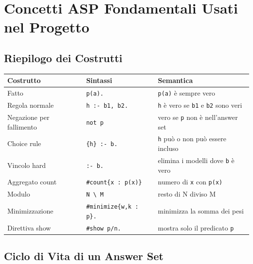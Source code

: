\documentclass[12pt,a4paper]{article}
\begin{document}
\section{Concetti ASP Fondamentali Usati nel Progetto}

\subsection{Riepilogo dei Costrutti}

\begin{center}
\renewcommand{\arraystretch}{1.4}
\begin{tabular}{p{4.5cm}p{4cm}p{5cm}}
\toprule
\textbf{Costrutto} & \textbf{Sintassi} & \textbf{Semantica} \\
\midrule
Fatto & \texttt{p(a).} & \texttt{p(a)} è sempre vero \\
Regola normale & \texttt{h :- b1, b2.} & \texttt{h} è vero se \texttt{b1} e \texttt{b2} sono veri \\
Negazione per fallimento & \texttt{not p} & vero se \texttt{p} non è nell'answer set \\
Choice rule & \texttt{\{h\} :- b.} & \texttt{h} può o non può essere incluso \\
Vincolo hard & \texttt{:- b.} & elimina i modelli dove \texttt{b} è vero \\
Aggregato count & \texttt{\#count\{x : p(x)\}} & numero di \texttt{x} con \texttt{p(x)} \\
Modulo & \texttt{N \textbackslash{} M} & resto di N diviso M \\
Minimizzazione & \texttt{\#minimize\{w,k : p\}.} & minimizza la somma dei pesi \\
Direttiva show & \texttt{\#show p/n.} & mostra solo il predicato \texttt{p} \\
\bottomrule
\end{tabular}
\end{center}

\subsection{Ciclo di Vita di un Answer Set}
\end{document}
